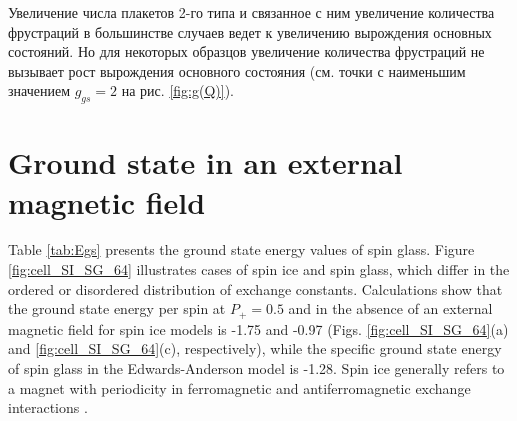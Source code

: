 \documentclass[utf8, babel, sor, jor, amsmath, amssymb, reprint]{elsarticle} %
\begin{document}
Увеличение числа плакетов 2-го типа и связанное с ним увеличение количества фрустраций в большинстве случаев ведет к увеличению вырождения основных состояний. Но для некоторых образцов увеличение количества фрустраций не вызывает рост вырождения основного состояния (см. точки с наименьшим значением $g_{gs}=2$ на рис. \ref{fig:g(Q)}). 

\section{Ground state in an external magnetic field}

Table \ref{tab:Egs} presents the ground state energy values of spin glass. Figure \ref{fig:cell_SI_SG_64} illustrates cases of spin ice and spin glass, which differ in the ordered or disordered distribution of exchange constants. Calculations show that the ground state energy per spin at $P_+ = 0.5$ and in the absence of an external magnetic field for spin ice models is -1.75 and -0.97 (Figs. \ref{fig:cell_SI_SG_64}(a) and \ref{fig:cell_SI_SG_64}(c), respectively), while the specific ground state energy of spin glass in the Edwards-Anderson model is -1.28. Spin ice generally refers to a magnet with periodicity in ferromagnetic and antiferromagnetic exchange interactions \cite{peretyatko2017interplay, otsuka2018husimi, andriushchenko2019large, shevchenko2017effect, kato2022flux}. 
\end{document}
